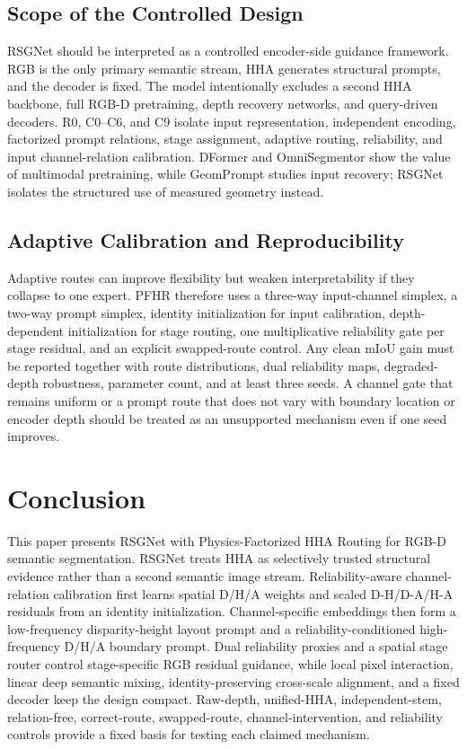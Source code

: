 \documentclass[a4paper,fleqn]{cas-dc}
\begin{document}
\subsection{Scope of the Controlled Design}

RSGNet should be interpreted as a controlled encoder-side guidance framework. RGB is the only primary semantic stream, HHA generates structural prompts, and the decoder is fixed. The model intentionally excludes a second HHA backbone, full RGB-D pretraining, depth recovery networks, and query-driven decoders. R0, C0--C6, and C9 isolate input representation, independent encoding, factorized prompt relations, stage assignment, adaptive routing, reliability, and input channel-relation calibration. DFormer and OmniSegmentor show the value of multimodal pretraining, while GeomPrompt studies input recovery; RSGNet isolates the structured use of measured geometry instead.

\subsection{Adaptive Calibration and Reproducibility}

Adaptive routes can improve flexibility but weaken interpretability if they collapse to one expert. PFHR therefore uses a three-way input-channel simplex, a two-way prompt simplex, identity initialization for input calibration, depth-dependent initialization for stage routing, one multiplicative reliability gate per stage residual, and an explicit swapped-route control. Any clean mIoU gain must be reported together with route distributions, dual reliability maps, degraded-depth robustness, parameter count, and at least three seeds. A channel gate that remains uniform or a prompt route that does not vary with boundary location or encoder depth should be treated as an unsupported mechanism even if one seed improves.

\section{Conclusion}\label{sec:conclusion}

This paper presents RSGNet with Physics-Factorized HHA Routing for RGB-D semantic segmentation. RSGNet treats HHA as selectively trusted structural evidence rather than a second semantic image stream. Reliability-aware channel-relation calibration first learns spatial D/H/A weights and scaled D-H/D-A/H-A residuals from an identity initialization. Channel-specific embeddings then form a low-frequency disparity-height layout prompt and a reliability-conditioned high-frequency D/H/A boundary prompt. Dual reliability proxies and a spatial stage router control stage-specific RGB residual guidance, while local pixel interaction, linear deep semantic mixing, identity-preserving cross-scale alignment, and a fixed decoder keep the design compact. Raw-depth, unified-HHA, independent-stem, relation-free, correct-route, swapped-route, channel-intervention, and reliability controls provide a fixed basis for testing each claimed mechanism.
\end{document}
